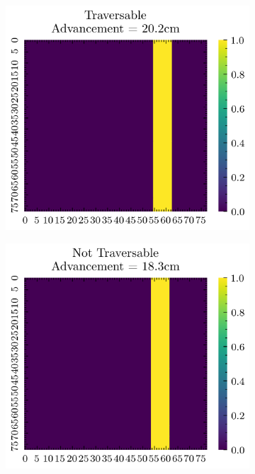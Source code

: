 \begin{figure}[H]
    \centering
    \begin{subfigure}[b]{0.33\textwidth}
        \includegraphics[width=\linewidth]{../img/5/custom_patches/walls_front/1-2d.png}
        \end{subfigure}   
    \begin{subfigure}[b]{0.33\textwidth}
        \includegraphics[width=\linewidth]{../img/5/custom_patches/walls_front/2-2d.png}

\end{subfigure}
\end{figure}
